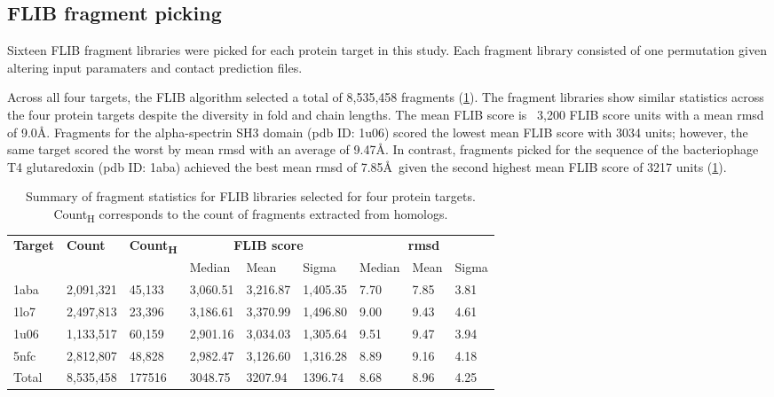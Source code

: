 \subsection{FLIB fragment picking}
Sixteen FLIB fragment libraries were picked for each protein target in this study. Each fragment library consisted of one permutation given altering input paramaters and contact prediction files.

Across all four targets, the FLIB algorithm selected a total of 8,535,458 fragments (\cref{table:ample_flib_frag_summary}). The fragment libraries show similar statistics across the four protein targets despite the diversity in fold and chain lengths. The mean FLIB score is ~3,200 FLIB score units with a mean \gls{rmsd} of 9.0\AA. Fragments for the alpha-spectrin SH3 domain (\gls{pdb} ID: 1u06) scored the lowest mean FLIB score with 3034 units; however, the same target scored the worst by mean \gls{rmsd} with an average of 9.47\AA. In contrast, fragments picked for the sequence of the bacteriophage T4 glutaredoxin (\gls{pdb} ID: 1aba) achieved the best mean \gls{rmsd} of 7.85\AA\ given the second highest mean FLIB score of 3217 units (\cref{table:ample_flib_frag_summary}).

\begin{table}[H]
  \centering
  \scriptsize
  \caption[FLIB fragment characterics across four protein targets]{Summary of fragment statistics for FLIB libraries selected for four protein targets. Count\textsubscript{H} corresponds to the count of fragments extracted from homologs.}
  \label{table:ample_flib_frag_summary}
  \begin{tabularx}{\textwidth}{X X X X X X X X X}
      \hline
      \multirow{2}{*}{\textbf{Target}} & \multirow{2}{*}{\textbf{Count}} & \multirow{2}{*}{\textbf{Count\textsubscript{H}}} & \multicolumn{3}{c}{\textbf{FLIB score}} & \multicolumn{3}{c}{\textbf{\gls{rmsd}}} \\ \cline{4-9}
      		&			&			& Median 	& Mean 		& Sigma 	& Median 	& Mean 	& Sigma \\
      \hline
      1aba	& 2,091,321	& 45,133		& 3,060.51	& 3,216.87	& 1,405.35	& 7.70	& 7.85	& 3.81	\\
	  1lo7	& 2,497,813	& 23,396		& 3,186.61	& 3,370.99	& 1,496.80	& 9.00	& 9.43	& 4.61	\\
      1u06	& 1,133,517	& 60,159		& 2,901.16	& 3,034.03	& 1,305.64	& 9.51	& 9.47	& 3.94	\\
      5nfc	& 2,812,807	& 48,828		& 2,982.47	& 3,126.60	& 1,316.28	& 8.89	& 9.16	& 4.18	\\
      \hline
      Total	& 8,535,458	& 177516		& 3048.75	& 3207.94	& 1396.74	& 8.68	& 8.96	& 4.25	\\
      \hline
  \end{tabularx}
\end{table}

